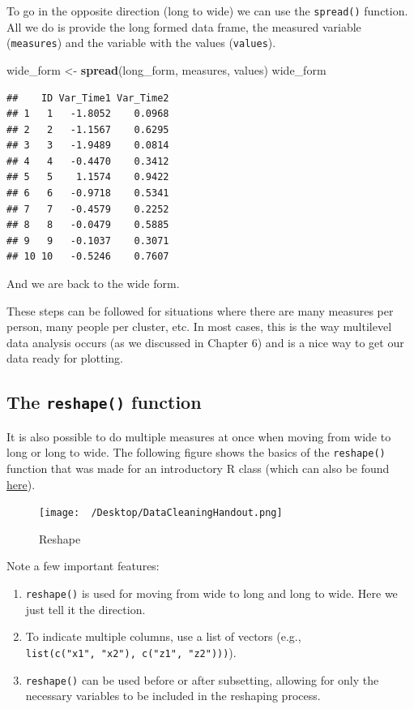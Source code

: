 \documentclass[]{tufte-book}
\newenvironment{Shaded}{}{}
\newcommand{\KeywordTok}[1]{\textcolor[rgb]{0.00,0.44,0.13}{\textbf{#1}}}
\newcommand{\StringTok}[1]{\textcolor[rgb]{0.25,0.44,0.63}{#1}}
\newcommand{\NormalTok}[1]{#1}
\providecommand{\tightlist}{%
  \setlength{\itemsep}{0pt}\setlength{\parskip}{0pt}}
\theoremstyle{definition}
\theoremstyle{definition}
\theoremstyle{remark}
\begin{document}
To go in the opposite direction (long to wide) we can use the
\texttt{spread()} function. All we do is provide the long formed data
frame, the measured variable (\texttt{measures}) and the variable with
the values (\texttt{values}).

\begin{Shaded}
\begin{Highlighting}[]
\NormalTok{wide_form <-}\StringTok{ }\KeywordTok{spread}\NormalTok{(long_form, measures, values)}
\NormalTok{wide_form}
\end{Highlighting}
\end{Shaded}

\begin{verbatim}
##    ID Var_Time1 Var_Time2
## 1   1   -1.8052    0.0968
## 2   2   -1.1567    0.6295
## 3   3   -1.9489    0.0814
## 4   4   -0.4470    0.3412
## 5   5    1.1574    0.9422
## 6   6   -0.9718    0.5341
## 7   7   -0.4579    0.2252
## 8   8   -0.0479    0.5885
## 9   9   -0.1037    0.3071
## 10 10   -0.5246    0.7607
\end{verbatim}

And we are back to the wide form.

These steps can be followed for situations where there are many measures
per person, many people per cluster, etc. In most cases, this is the way
multilevel data analysis occurs (as we discussed in Chapter 6) and is a
nice way to get our data ready for plotting.

\subsection*{\texorpdfstring{The \texttt{reshape()}
function}{The reshape() function}}\label{the-reshape-function}

It is also possible to do multiple measures at once when moving from
wide to long or long to wide. The following figure shows the basics of
the \texttt{reshape()} function that was made for an introductory R
class (which can also be found
\href{https://tysonstanley.github.io/assets/images/DataCleaning_Handout.pdf}{here}).

\begin{figure}
\centering
\texttt{[image: ~/Desktop/DataCleaningHandout.png]}
\caption{Reshape}
\end{figure}

Note a few important features:

\begin{enumerate}
\def\labelenumi{\arabic{enumi}.}
\tightlist
\item
  \texttt{reshape()} is used for moving from wide to long and long to
  wide. Here we just tell it the direction.
\item
  To indicate multiple columns, use a list of vectors (e.g.,
  \texttt{list(c("x1",\ "x2"),\ c("z1",\ "z2")))}).
\item
  \texttt{reshape()} can be used before or after subsetting, allowing
  for only the necessary variables to be included in the reshaping
  process.
\end{enumerate}
\end{document}
